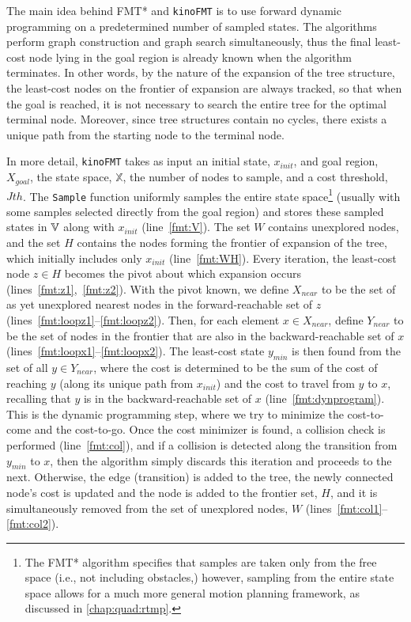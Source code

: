 The main idea behind FMT* and \texttt{kinoFMT} is to use forward dynamic programming on a predetermined number of sampled states. The algorithms perform graph construction and graph search simultaneously, thus the final least-cost node lying in the goal region is already known when the algorithm terminates. In other words, by the nature of the expansion of the tree structure, the least-cost nodes on the frontier of expansion are always tracked, so that when the goal is reached, it is not necessary to search the entire tree for the optimal terminal node. Moreover, since tree structures contain no cycles, there exists a unique path from the starting node to the terminal node.

In more detail, \texttt{kinoFMT} takes as input an initial state, $x_{init}$, and goal region, $X_{goal}$, the state space, $\mathbb{X}$, the number of nodes to sample, and a cost threshold, $Jth$. The \texttt{Sample} function uniformly samples the entire state space\footnote{The FMT* algorithm specifies that samples are taken only from the free space (i.e., not including obstacles,) however, sampling from the entire state space allows for a much more general motion planning framework, as discussed in \autoref{chap:quad:rtmp}.} (usually with some samples selected directly from the goal region) and stores these sampled states in $\mathbb{V}$ along with $x_{init}$ (line~\ref{fmt:V}). 
The set $W$ contains unexplored nodes, and the set $H$ contains the nodes forming the frontier of expansion of the tree, which initially includes only $x_{init}$ (line~\ref{fmt:WH}). 
Every iteration, the least-cost node $z \in H$ becomes the pivot about which expansion occurs ({lines~\ref{fmt:z1},~\ref{fmt:z2}}). 
With the pivot known, we define $X_{near}$ to be the set of as yet unexplored nearest nodes in the forward-reachable set of $z$ ({lines~\ref{fmt:loopz1}--\ref{fmt:loopz2}}). 
Then, for each element $x \in X_{near}$, define $Y_{near}$ to be the set of nodes in the frontier that are also in the backward-reachable set of $x$ ({lines~\ref{fmt:loopx1}--\ref{fmt:loopx2}}). 
The least-cost state $y_{min}$ is then found from the set of all $y \in Y_{near}$, where the cost is determined to be the sum of the cost of reaching $y$ (along its unique path from $x_{init}$) and the cost to travel from $y$ to $x$, recalling that $y$ is in the backward-reachable set of $x$ (line~\ref{fmt:dynprogram}). This is the dynamic programming step, where we try to minimize the cost-to-come and the cost-to-go. 
Once the cost minimizer is found, a collision check is performed (line~\ref{fmt:col}), and if a collision is detected along the transition from $y_{min}$ to $x$, then the algorithm simply discards this iteration and proceeds to the next. Otherwise, the edge (transition) is added to the tree, the newly connected node's cost is updated and the node is added to the frontier set, $H$, and it is simultaneously removed from the set of unexplored nodes, $W$ ({lines~\ref{fmt:col1}--\ref{fmt:col2}}). 

